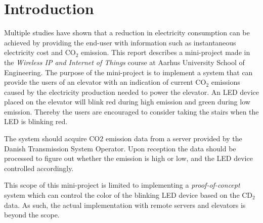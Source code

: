 \documentclass[Main]{subfiles}
\begin{document}
\section{Introduction} %
\label{sec:introduction}
	Multiple studies have shown that a reduction in electricity consumption can be achieved by providing the end-user with information such as instantaneous electricity cost and CO$_2$ emission\cite{Tricascade:2009:Online}. 
	This report describes a mini-project made in the \emph{Wireless IP and Internet of Things} course at Aarhus University School of Engineering. 
	The purpose of the mini-project is to implement a system that can provide the users of an elevator with an indication of current CO$_2$ emissions caused by the electricity production needed to power the elevator. 
	An LED device placed on the elevator will blink red during high emission and green during low emission. 
	Thereby the users are encouraged to consider taking the stairs when the LED is blinking red. 

	The system should acquire CO$2$ emission data from a server provided by the Danish Transmission System Operator. 
	Upon reception the data should be processed to figure out whether the emission is high or low, and the LED device controlled accordingly.

	This scope of this mini-project is limited to implementing a \emph{proof-of-concept} system which can control the color of the blinking LED device based on the CD$_2$ data.
	As such, the actual implementation with remote servers and elevators is beyond the scope.



\end{document}
